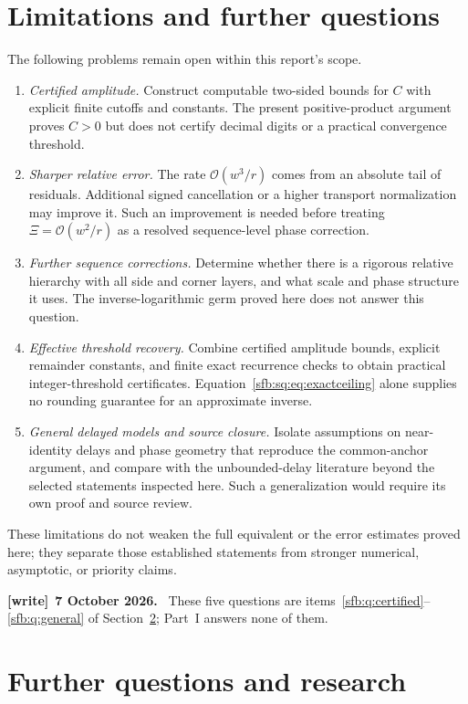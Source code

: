 \documentclass[11pt]{article}
\theoremstyle{remark}\newtheorem{remark}[theorem]{Remark}
\newcommand{\OO}{\mathcal O}
\newenvironment{writenote}[1][]{\par\smallskip\begingroup\small
 \noindent\textbf{[write]}\if\relax\detokenize{#1}\relax\else~\textbf{#1.}\fi\ }%
 {\par\endgroup\smallskip}
\begin{document}
\section{Limitations and further questions}\label{sfb:sq:sec:questions}
The following problems remain open within this report's scope.
\begin{enumerate}
\item \emph{Certified amplitude.} Construct computable two-sided bounds for $C$ with explicit finite cutoffs and constants. The present positive-product argument proves $C>0$ but does not certify decimal digits or a practical convergence threshold.
\item \emph{Sharper relative error.} The rate $\OO(w^3/r)$ comes from an absolute tail of residuals. Additional signed cancellation or a higher transport normalization may improve it. Such an improvement is needed before treating $\Xi=\OO(w^2/r)$ as a resolved sequence-level phase correction.
\item \emph{Further sequence corrections.} Determine whether there is a rigorous relative hierarchy with all side and corner layers, and what scale and phase structure it uses. The inverse-logarithmic germ proved here does not answer this question.
\item \emph{Effective threshold recovery.} Combine certified amplitude bounds, explicit remainder constants, and finite exact recurrence checks to obtain practical integer-threshold certificates. Equation~\eqref{sfb:sq:eq:exactceiling} alone supplies no rounding guarantee for an approximate inverse.
\item \emph{General delayed models and source closure.} Isolate assumptions on near-identity delays and phase geometry that reproduce the common-anchor argument, and compare with the unbounded-delay literature beyond the selected statements inspected here. Such a generalization would require its own proof and source review.
\end{enumerate}
These limitations do not weaken the full equivalent or the error estimates proved here; they separate those established statements from stronger numerical, asymptotic, or priority claims.

\begin{writenote}[7 October 2026]
These five questions are items~\ref{sfb:q:certified}--\ref{sfb:q:general} of Section~\ref{sfb:sec:further}; Part~I answers none of them.
\end{writenote}

\section{Further questions and research}\label{sfb:sec:further}
\end{document}

